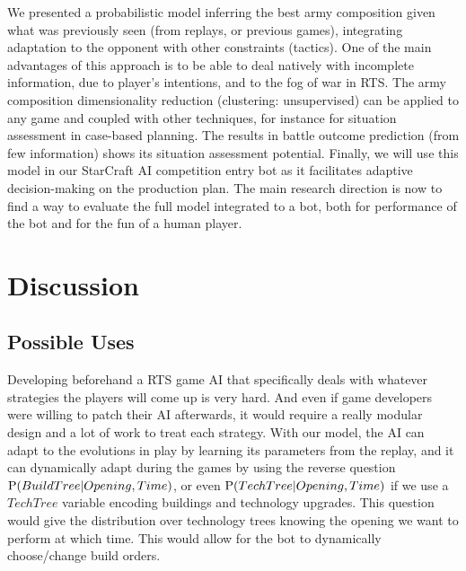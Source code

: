 We presented a probabilistic model inferring the best army composition given what was previously seen (from replays, or previous games), integrating adaptation to the opponent with other constraints (tactics). One of the main advantages of this approach is to be able to deal natively with incomplete information, due to player's intentions, and to the fog of war in RTS. The army composition dimensionality reduction (clustering: unsupervised) can be applied to any game and coupled with other techniques, for instance for situation assessment in case-based planning. The results in battle outcome prediction (from few information) shows its situation assessment potential. Finally, we will use this model in our StarCraft AI competition entry bot as it facilitates adaptive decision-making on the production plan. The main research direction is now to find a way to evaluate the full model integrated to a bot, both for performance of the bot and for the fun of a human player.





\section{Discussion}

\subsection{Possible Uses}
Developing beforehand a RTS game AI that specifically deals with whatever strategies the players will come up is very hard. And even if game developers were willing to patch their AI afterwards, it would require a really modular design and a lot of work to treat each strategy. With our model, the AI can adapt to the evolutions in play by learning its parameters from the replay, and it can dynamically adapt during the games by using the reverse question $\mathrm{P}(BuildTree | Opening,Time)$, or even $\mathrm{P}(TechTree | Opening, Time)$ if we use a $TechTree$ variable encoding buildings and technology upgrades. This question would give the distribution over technology trees knowing the opening we want to perform at which time. This would allow for the bot to dynamically choose/change build orders.


